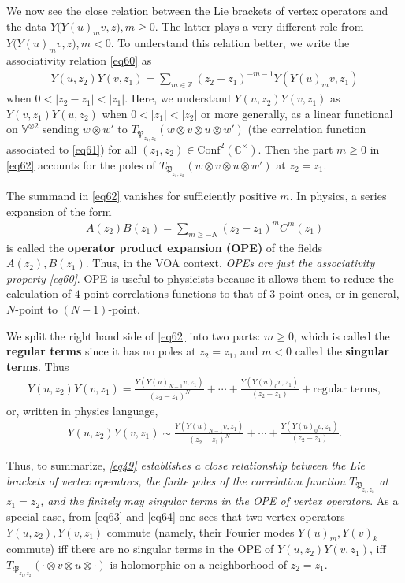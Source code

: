 \documentclass[12pt,a4paper,notitlepage]{article}
\theoremstyle{definition}
\theoremstyle{plain}
\newcommand{\fk}{\mathfrak}
\newcommand{\Conf}{\mathrm{Conf}}
\newcommand{\Vbb}{\mathbb V}
\newcommand{\Cbb}{\mathbb C}
\newcommand{\Zbb}{\mathbb Z}
\numberwithin{equation}{section}
\begin{document}
We now see the close relation between the Lie brackets of vertex operators and the data $Y\big(Y(u)_mv,z\big),m\geq0$. The latter plays a very different role from $Y\big(Y(u)_mv,z\big),m<0$. To understand this relation better, we write the associativity relation \eqref{eq60} as
\begin{align}
Y(u,z_2)Y(v,z_1)=\sum_{m\in\Zbb}(z_2-z_1)^{-m-1}Y(Y(u)_mv,z_1)\label{eq62}	
\end{align}
when $0<|z_2-z_1|<|z_1|$. Here, we understand $Y(u,z_2)Y(v,z_1)$ as $Y(v,z_1)Y(u,z_2)$ when $0<|z_1|<|z_2|$ or more generally, as a linear functional on $\Vbb^{\otimes 2}$ sending $w\otimes w'$ to $T_{\fk P_{z_1,z_2}}(w\otimes v\otimes u\otimes w')$ (the correlation function associated to \eqref{eq61}) for all $(z_1,z_2)\in\Conf^2(\Cbb^\times)$. Then the part $m\geq 0$ in \eqref{eq62} accounts for the poles of $T_{\fk P_{z_1,z_2}}(w\otimes v\otimes u\otimes w')$ at $z_2=z_1$.

The summand in \eqref{eq62} vanishes for sufficiently positive $m$. In physics, a series expansion of the form
\begin{align*}
	A(z_2)B(z_1)=\sum_{m\geq -N}(z_2-z_1)^mC^m(z_1)
\end{align*}
is called the  \textbf{operator product expansion (OPE)} of the fields $A(z_2),B(z_1)$. Thus, in the VOA context, \emph{OPEs are just the associativity property \eqref{eq60}}. OPE is useful to physicists because it allows them to reduce the calculation of $4$-point correlations functions to that of $3$-point ones, or in general, $N$-point to $(N-1)$-point.

We split the right hand side of \eqref{eq62} into two parts: $m\geq 0$, which is called the \textbf{regular terms} since it has no poles at $z_2=z_1$, and $m<0$ called the \textbf{singular terms}. Thus
\begin{align*}
Y(u,z_2)Y(v,z_1)=\frac{Y(Y(u)_{N-1}v,z_1)}{(z_2-z_1)^N}+\cdots+	\frac{Y(Y(u)_0v,z_1)}{(z_2-z_1)}+\text{regular terms},
\end{align*}
or, written in physics language,
\begin{align}
	Y(u,z_2)Y(v,z_1)\sim\frac{Y(Y(u)_{N-1}v,z_1)}{(z_2-z_1)^N}+\cdots+	\frac{Y(Y(u)_0v,z_1)}{(z_2-z_1)}.
\end{align}

Thus, to summarize, \emph{\eqref{eq49} establishes a close relationship between the Lie brackets of vertex operators,  the finite poles of the correlation function $T_{\fk P_{z_1,z_2}}$ at $z_1=z_2$, and the finitely may singular terms in the OPE of vertex operators}. As a special case, from \eqref{eq63} and \eqref{eq64} one sees that two vertex operators $Y(u,z_2),Y(v,z_1)$ commute (namely, their Fourier modes $Y(u)_m,Y(v)_k$ commute) iff there are no singular terms in the OPE of $Y(u,z_2)Y(v,z_1)$, iff $T_{\fk P_{z_1,z_2}}(\cdot\otimes v\otimes u\otimes\cdot)$ is holomorphic on a neighborhood of $z_2=z_1$. 
\end{document}
